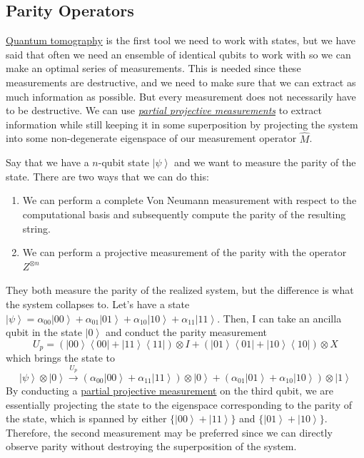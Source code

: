 \documentclass{article}
\newcommand{\ket}[1]{\ensuremath{\left|#1\right\rangle}}
\newcommand{\bra}[1]{\ensuremath{\left\langle#1\right|}}
\newcounter{example}[section]
\begin{document}
  \subsection{Parity Operators}

    \hyperref[def:quantum-tomography]{Quantum tomography} is the first tool we need to work with states, but we have said that often we need an ensemble of identical qubits to work with so we can make an optimal series of measurements. This is needed since these measurements are destructive, and we need to make sure that we can extract as much information as possible. But every measurement does not necessarily have to be destructive. We can use \textit{\hyperref[def:partial-projective-measurement]{partial projective measurements}} to extract information while still keeping it in some superposition by projecting the system into some non-degenerate eigenspace of our measurement operator $\hat{M}$. 

    \begin{example}
      \label{ex:computing-parity}
      Say that we have a $n$-qubit state $\ket{\psi}$ and we want to measure the parity of the state. There are two ways that we can do this: 
      \begin{enumerate}
        \item We can perform a complete Von Neumann measurement with respect to the computational basis and subsequently compute the parity of the resulting string. 
        \item We can perform a projective measurement of the parity with the operator $Z^{\otimes n}$ 
      \end{enumerate}
      They both measure the parity of the realized system, but the difference is what the system collapses to. Let's have a state $\ket{\psi} = \alpha_{00} \ket{00} + \alpha_{01} \ket{01} + \alpha_{10} \ket{10} + \alpha_{11} \ket{11}$. Then, I can take an ancilla qubit in the state $\ket{0}$ and conduct the parity measurement 
      \begin{equation}
        U_p = (\ket{00} \bra{00} + \ket{11} \bra{11}) \otimes I + (\ket{01} \bra{01} + \ket{10} \bra{10}) \otimes X
      \end{equation}
      which brings the state to 
      \begin{equation} 
        \ket{\psi} \otimes \ket{0} \xrightarrow{U_p} (\alpha_{00} \ket{00} + \alpha_{11} \ket{11}) \otimes \ket{0} + (\alpha_{01} \ket{01} + \alpha_{10} \ket{10}) \otimes \ket{1}
      \end{equation}
      By conducting a \hyperref[def:partial-projective-measurement]{partial projective measurement} on the third qubit, we are essentially projecting the state to the eigenspace corresponding to the parity of the state, which is spanned by either $\{\ket{00} + \ket{11}\}$ and $\{\ket{01} + \ket{10}\}$. Therefore, the second measurement may be preferred since we can directly observe parity without destroying the superposition of the system.
    \end{example}
\end{document}
